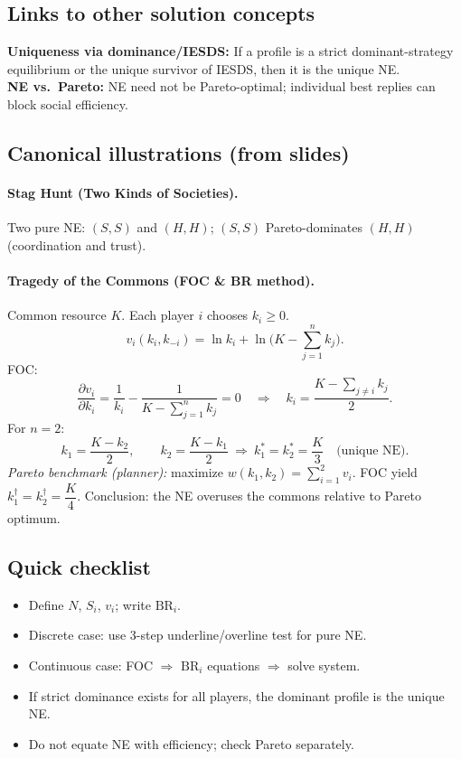 \documentclass[9pt]{article}
\newcommand{\br}{\mathrm{BR}}
\begin{document}
\subsection*{Links to other solution concepts}
\textbf{Uniqueness via dominance/IESDS:} If a profile is a strict dominant-strategy equilibrium or the unique survivor of IESDS, then it is the unique NE. \\
\textbf{NE vs.\ Pareto:} NE need not be Pareto-optimal; individual best replies can block social efficiency.

\subsection*{Canonical illustrations (from slides)}
\paragraph{Stag Hunt (Two Kinds of Societies).} Two pure NE: $(S,S)$ and $(H,H)$; $(S,S)$ Pareto-dominates $(H,H)$ (coordination and trust).

\paragraph{Tragedy of the Commons (FOC \& BR method).}
Common resource $K$. Each player $i$ chooses $k_i\ge 0$.
\[
v_i(k_i,k_{-i})=\ln k_i+\ln\!\Big(K-\sum_{j=1}^n k_j\Big).
\]
FOC:
\[
\frac{\partial v_i}{\partial k_i}=\frac{1}{k_i}-\frac{1}{K-\sum_{j=1}^n k_j}=0
\quad\Longrightarrow\quad
k_i=\frac{K-\sum_{j\ne i}k_j}{2}.
\]
For $n=2$:
\[
k_1=\frac{K-k_2}{2},\qquad k_2=\frac{K-k_1}{2}
\ \Longrightarrow\ 
k_1^*=k_2^*=\frac{K}{3}\quad\text{(unique NE)}.
\]
\emph{Pareto benchmark (planner):} maximize $w(k_1,k_2)=\sum_{i=1}^2 v_i$.
FOC yield $k_1^\dagger=k_2^\dagger=\dfrac{K}{4}$.
Conclusion: the NE overuses the commons relative to Pareto optimum.

\subsection*{Quick checklist}
\begin{itemize}
\item Define $N$, $S_i$, $v_i$; write $\br_i$.
\item Discrete case: use 3-step underline/overline test for pure NE.
\item Continuous case: FOC $\Rightarrow$ $\br_i$ equations $\Rightarrow$ solve system.
\item If strict dominance exists for all players, the dominant profile is the unique NE.
\item Do not equate NE with efficiency; check Pareto separately.
\end{itemize}
\end{document}
